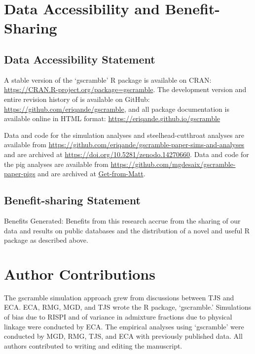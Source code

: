 \section*{Data Accessibility and Benefit-Sharing}

\subsection*{Data Accessibility Statement}

A stable version of the `gscramble' R package is available on CRAN: \url{https://CRAN.R-project.org/package=gscramble}. The development version and entire revision history of
\gscramble{} is available on GitHub: \url{https://github.com/eriqande/gscramble}, and all package documentation is available online in HTML format: \url{https://eriqande.github.io/gscramble}

Data and code for the simulation analyses and steelhead-cutthroat analyses are available from \url{https://github.com/eriqande/gscramble-paper-sims-and-analyses} and are archived at \url{https://doi.org/10.5281/zenodo.14270660}.  Data and code for the pig analyses are available from \url{https://github.com/mgdesaix/gscramble-paper-pigs} and are archived
at \url{Get-from-Matt}.

\subsection*{Benefit-sharing Statement}

Benefits Generated: Benefits from this research accrue from the sharing of our data and results on public databases and the distribution of a novel and useful R package as described above.

\section*{Author Contributions}

The gscramble simulation approach grew from discussions between TJS and ECA\@.
ECA, RMG, MGD, and TJS wrote the R package, `gscramble.'   Simulations of bias due to RISPI and
of variance in admixture fractions due to physical linkage were conducted by ECA.
The empirical analyses using `gscramble' were conducted by MGD, RMG, TJS, and ECA with previously published data.
All authors contributed to writing and editing the manuscript.

